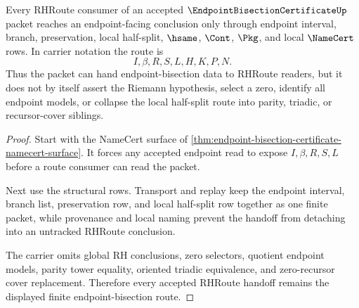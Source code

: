 \begin{theorem}
\label{thm:endpoint-bisection-certificate-rhroute-handoff}
Every RHRoute consumer of an accepted $\EndpointBisectionCertificateUp$ packet reaches an endpoint-facing conclusion only through endpoint interval, branch, preservation, local half-split, $\hsame$, $\Cont$, $\Pkg$, and local $\NameCert$ rows. In carrier notation the route is
$$
I,\beta,R,S,L,H,K,P,N .
$$
Thus the packet can hand endpoint-bisection data to RHRoute readers, but it does not by itself assert the Riemann hypothesis, select a zero, identify all endpoint models, or collapse the local half-split route into parity, triadic, or recursor-cover siblings.
\end{theorem}
\begin{proof}
Start with the NameCert surface of \autoref{thm:endpoint-bisection-certificate-namecert-surface}. It forces any accepted endpoint read to expose $I,\beta,R,S,L$ before a route consumer can read the packet.

Next use the structural rows. Transport and replay keep the endpoint interval, branch list, preservation row, and local half-split row together as one finite packet, while provenance and local naming prevent the handoff from detaching into an untracked RHRoute conclusion.

The carrier omits global RH conclusions, zero selectors, quotient endpoint models, parity tower equality, oriented triadic equivalence, and zero-recursor cover replacement. Therefore every accepted RHRoute handoff remains the displayed finite endpoint-bisection route.
\end{proof}



